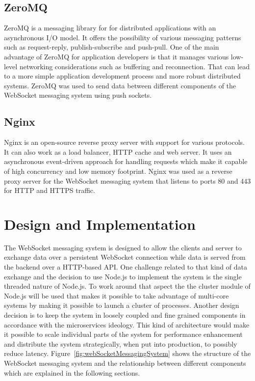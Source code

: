 \subsection{ZeroMQ}

ZeroMQ is a messaging library for for distributed applications with an asynchronous I/O model. It offers the possibility of various messaging patterns such as request-reply, publish-subscribe and push-pull. One of the main advantage of ZeroMQ for application developers is that it manages various low-level networking considerations such as buffering and reconnection. That can lead to a more simple application development process and more robust distributed systems. ZeroMQ was used to send data between different components of the WebSocket messaging system using push sockets.

\subsection{Nginx}

Nginx is an open-source reverse proxy server with support for various protocols. It can also work as a load balancer, HTTP cache and web server. It uses an asynchronous event-driven approach for handling requests which make it capable of high concurrency and low memory footprint. Nginx was used as a reverse proxy server for the WebSocket messaging system that listens to ports 80 and 443 for HTTP and HTTPS traffic.

\section{Design and Implementation}

The WebSocket messaging system is designed to allow the clients and server to exchange data over a persistent WebSocket connection while data is served from the backend over a HTTP-based API. One challenge related to that kind of data exchange and the decision to use Node.js to implement the system is the single threaded nature of Node.js. To work around that aspect the the cluster module of Node.js will be used that makes it possible to take advantage of multi-core systems by making it possible to launch a cluster of processes. Another design decision is to keep the system in loosely coupled and fine grained components in accordance with the microservices ideology. This kind of architecture would make it possible to scale individual parts of the system for performance enhancement and distribute the system strategically, when put into production, to possibly reduce latency. Figure~\ref{fig:webSocketMessagingSystem} shows the structure of the WebSocket messaging system and the relationship between different components which are explained in the following sections.

